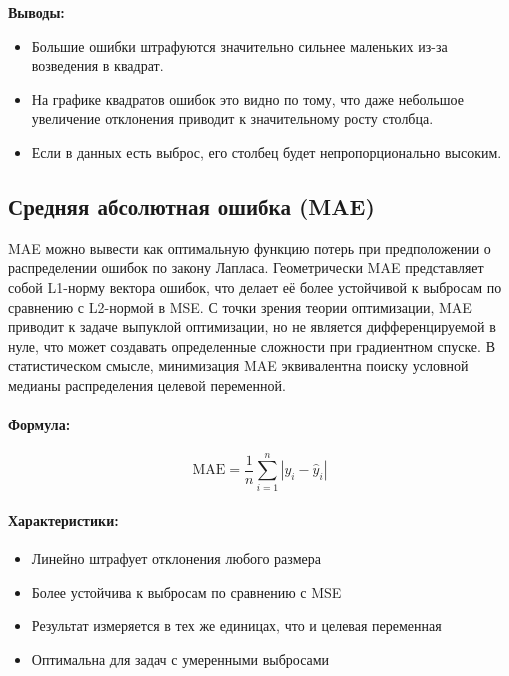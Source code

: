 \noindent\textbf{Выводы:}
\begin{itemize}
    \item Большие ошибки штрафуются значительно сильнее маленьких из-за возведения в квадрат.
    \item На графике квадратов ошибок это видно по тому, что даже небольшое увеличение отклонения приводит к значительному росту столбца.
    \item Если в данных есть выброс, его столбец будет непропорционально высоким.
\end{itemize}
\subsection{Средняя абсолютная ошибка (MAE)}

MAE можно вывести как оптимальную функцию потерь при предположении о распределении ошибок по закону Лапласа. Геометрически MAE представляет собой L1-норму вектора ошибок, что делает её более устойчивой к выбросам по сравнению с L2-нормой в MSE. С точки зрения теории оптимизации, MAE приводит к задаче выпуклой оптимизации, но не является дифференцируемой в нуле, что может создавать определенные сложности при градиентном спуске. В статистическом смысле, минимизация MAE эквивалентна поиску условной медианы распределения целевой переменной.

\paragraph{Формула:}
\begin{equation}
    \text{MAE} = \frac{1}{n} \sum_{i=1}^{n} |y_i - \hat{y}_i|
\end{equation}

\paragraph{Характеристики:}
\begin{itemize}
    \item Линейно штрафует отклонения любого размера
    \item Более устойчива к выбросам по сравнению с MSE
    \item Результат измеряется в тех же единицах, что и целевая переменная
    \item Оптимальна для задач с умеренными выбросами
\end{itemize}

